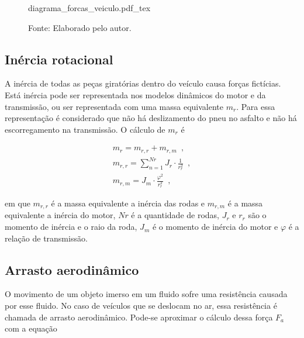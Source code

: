 \begin{figure}[h]
	\centering
	\caption{Diagrama de forças de um veículo em movimento}
	\label{fig:diag_forcas_veiculo}
	\begin{normalsize}
		{diagrama_forcas_veiculo.pdf_tex}
	\end{normalsize}
	\caption*{\footnotesize Fonte: Elaborado pelo autor.}
\end{figure}

\subsection{Inércia rotacional}

A inércia de todas as peças giratórias dentro do veículo causa forças fictícias. 
Está inércia pode ser representada nos modelos dinâmicos do motor e da transmissão, ou ser representada com uma massa equivalente $m_r$.
Para essa representação é considerado que não há deslizamento do pneu no asfalto e não há escorregamento na transmissão. O cálculo de $m_r$ é 

\begin{subequations}
	\label{eq:mr}
	\begin{align}
		m_r = m_{r,r} + m_{r,m} \enspace, \label{eq:mr1} \\
		m_{r,r} = \sum_{n=1}^{Nr} J_r \cdot \frac{1}{r_r^2} \enspace, \label{eq:mr2} \\
		m_{r,m} = J_m \cdot \frac{\varphi^2}{r_r^2} \enspace, \label{eq:mr3}
	\end{align}
\end{subequations}

em que $m_{r,r}$ é a massa equivalente a inércia das rodas e $m_{r,m}$ é a massa equivalente a inércia do motor, $Nr$ é a quantidade de rodas, 
$J_r$ e $r_r$ são o momento de inércia e o raio da roda, $J_m$ é o momento de inércia do motor e 
$\varphi$ é a relação de transmissão. \hbox{\cite[Seç.~2.1.1]{book:guzzella2012vehicle}}

\subsection{Arrasto aerodinâmico}
\label{subsec:arrasto_aerodinamico}

O movimento de um objeto imerso em um fluido sofre uma resistência causada por esse fluido. No
caso de veículos que se deslocam no ar, essa
resistência é chamada de arrasto aerodinâmico.
Pode-se aproximar o cálculo dessa força $F_{a}$ com a equação

